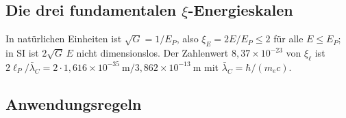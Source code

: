 	\subsection{Die drei fundamentalen $\xi$-Energieskalen}
	
	\begin{table}[H]
		\centering
		\caption{Die drei fundamentalen $\xi$-Parametertypen im T0-Modell}
		\label{tab:xi_hierarchy}
		\scriptsize\setlength{\tabcolsep}{3pt}
	\end{table}
	
	In natürlichen Einheiten ist $\sqrt{G} = 1/E_P$, also $\xi_E = 2E/E_P \le 2$ für alle $E \le E_P$; in SI ist $2\sqrt{G}\,E$ nicht dimensionslos. Der Zahlenwert $8,37\times10^{-23}$ von $\xi_\ell$ ist $2\ell_P/\bar{\lambda}_C = 2\cdot1,616\times10^{-35}~\text{m}/3,862\times10^{-13}~\text{m}$ mit $\bar{\lambda}_C = \hbar/(m_e c)$.
	
	\subsection{Anwendungsregeln}
	
